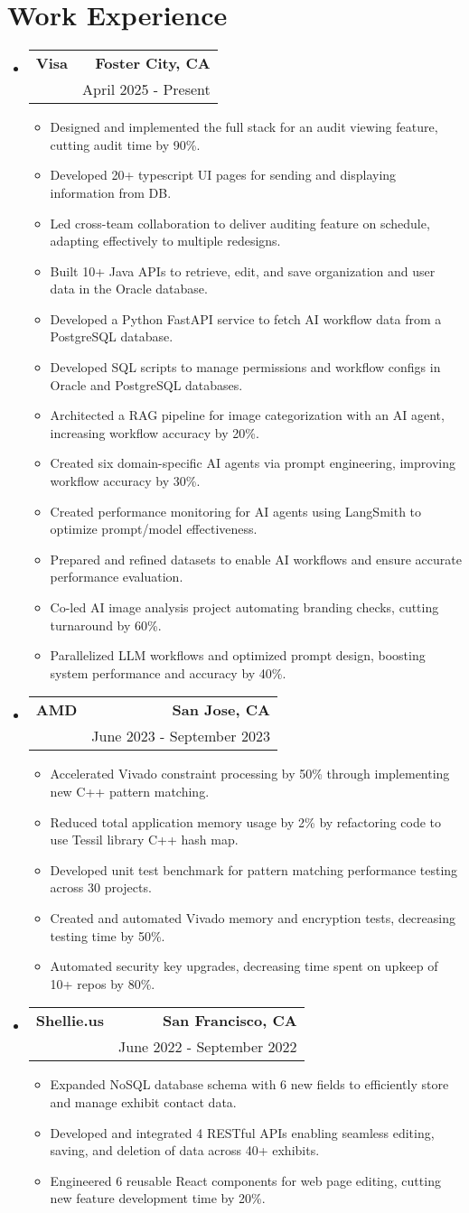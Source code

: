 \documentclass[letterpaper,11pt]{article}
\makeatletter
\newcommand{\resumeItem}[1]{
  \item\small{
    {#1 \vspace{-2pt}}
  }
}
\newcommand{\resumeSubheading}[4]{
  \vspace{-2pt}\item
    \begin{tabular*}{0.97\textwidth}[t]{l@{\extracolsep{\fill}}r}
      \textbf{#1} & #2 \\
      \text{#3} & #4 \\
    \end{tabular*}\vspace{-7pt}
}
\newcommand{\resumeSubHeadingListStart}{\begin{itemize}[leftmargin=0.15in, label={}]}
\newcommand{\resumeSubHeadingListEnd}{\end{itemize}}
\newcommand{\resumeItemListStart}{\begin{itemize}}
\newcommand{\resumeItemListEnd}{\end{itemize}\vspace{-5pt}}
\makeatother
\begin{document}
\section{\textbf{Work Experience}}
  \resumeSubHeadingListStart
    \resumeSubheading
    {Visa}{\textbf{Foster City, CA}}
    {Software Engineer, Java, JPA, Typescript, Python, fastAPI, SQL}{April 2025 - Present}
    \resumeItemListStart
        \resumeItem{Designed and implemented the full stack for an audit viewing feature, cutting audit time by 90\%.}
        \resumeItem{Developed 20+ typescript UI pages for sending and displaying information from DB.}
        \resumeItem{Led cross-team collaboration to deliver auditing feature on schedule, adapting effectively to multiple redesigns.}
        \resumeItem{Built 10+ Java APIs to retrieve, edit, and save organization and user data in the Oracle database.}
        \resumeItem{Developed a Python FastAPI service to fetch AI workflow data from a PostgreSQL database.}
        \resumeItem{Developed SQL scripts to manage permissions and workflow configs in Oracle and PostgreSQL databases.}
        \resumeItem{Architected a RAG pipeline for image categorization with an AI agent, increasing workflow accuracy by 20\%.}
        \resumeItem{Created six domain-specific AI agents via prompt engineering, improving workflow accuracy by 30\%.}
        \resumeItem{Created performance monitoring for AI agents using LangSmith to optimize prompt/model effectiveness.}
        \resumeItem{Prepared and refined datasets to enable AI workflows and ensure accurate performance evaluation.}
        \resumeItem{Co-led AI image analysis project automating branding checks, cutting turnaround by 60\%.}        
        \resumeItem{Parallelized LLM workflows and optimized prompt design, boosting system performance and accuracy by 40\%.}
    \resumeItemListEnd
    \resumeSubheading
    {AMD}{\textbf{San Jose, CA}}
    {Backend Software Engineer Intern, C++, Python}{June 2023 - September 2023}
    \resumeItemListStart
        \resumeItem{Accelerated Vivado constraint processing by 50\% through implementing new C++ pattern matching.}
        \resumeItem{Reduced total application memory usage by 2\% by refactoring code to use Tessil library C++ hash map.}
        \resumeItem{Developed unit test benchmark for pattern matching performance testing across 30 projects.}
        \resumeItem{Created and automated Vivado memory and encryption tests, decreasing testing time by 50\%.}
        \resumeItem{Automated security key upgrades, decreasing time spent on upkeep of 10+ repos by 80\%.}
    \resumeItemListEnd
    \resumeSubheading
    {Shellie.us}{\textbf{San Francisco, CA}}
    {Software Engineer Intern, React, JavaScript, NoSQL, JSON}{June 2022 - September 2022}
    \resumeItemListStart
        \resumeItem{Expanded NoSQL database schema with 6 new fields to efficiently store and manage exhibit contact data.}
        \resumeItem{Developed and integrated 4 RESTful APIs enabling seamless editing, saving, and deletion of data across 40+ exhibits.}
        \resumeItem{Engineered 6 reusable React components for web page editing, cutting new feature development time by 20\%.}
    \resumeItemListEnd
  \resumeSubHeadingListEnd
\end{document}
